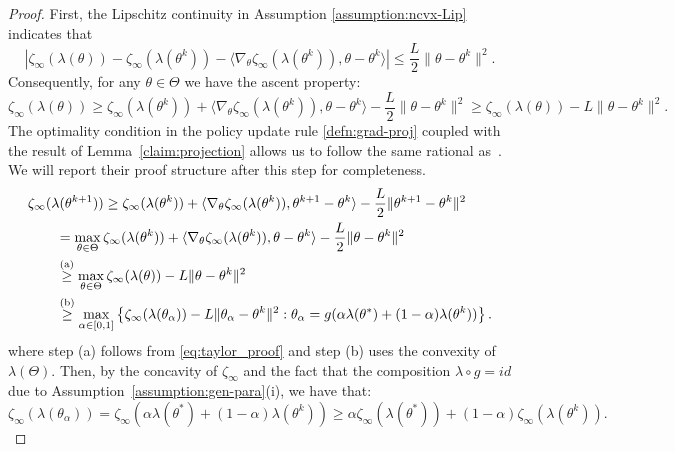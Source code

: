 \begin{proof}
    First, the Lipschitz continuity in Assumption \ref{assumption:ncvx-Lip} indicates that 
        $$\left|\zeta_\infty(\lambda(\theta)) - \zeta_\infty(\lambda(\theta^k)) - \langle \nabla_\theta\zeta_\infty(\lambda(\theta^k)),\theta-\theta^k\rangle\right|\leq \frac{L}{2}\|\theta-\theta^k\|^2.$$
        Consequently, for any $\theta\in\Theta$ we have the ascent property:
        \begin{equation}\label{eq:taylor_proof}
        \zeta_\infty(\lambda(\theta)) \geq \zeta_\infty(\lambda(\theta^k)) + \langle \nabla_\theta\zeta_\infty(\lambda(\theta^k)),\theta-\theta^k\rangle - \frac{L}{2}\|\theta-\theta^k\|^2 \geq \zeta_\infty(\lambda(\theta)) - L\|\theta-\theta^k\|^2.
        \end{equation}
        The optimality condition in the policy update rule \eqref{defn:grad-proj} coupled with the result of Lemma~\ref{claim:projection} allows us to follow the same rational as~\citet{zhang2020variationalpolicygradientmethod}. We will report their proof structure after this step for completeness.
    \begin{align}
        \label{thm:ItrCmp-1}
        \MoveEqLeft
        \zeta_\infty(\lambda(\theta^{k+1}))  \geq  \zeta_\infty(\lambda(\theta^k)) + \langle \nabla_\theta\zeta_\infty(\lambda(\theta^k)),\theta^{k+1}-\theta^k\rangle - \frac{L}{2}\|\theta^{k+1}-\theta^k\|^2 \nonumber \\
        & =  \max_{\theta\in\Theta} \zeta_\infty(\lambda(\theta^k)) + \langle \nabla_\theta\zeta_\infty(\lambda(\theta^k)),\theta-\theta^k\rangle - \frac{L}{2}\|\theta-\theta^k\|^2\nonumber\\
        & \overset{\text{(a)}}{\geq}  \max_{\theta\in\Theta} \zeta_\infty(\lambda(\theta)) - L\|\theta-\theta^k\|^2\nonumber\\
        & \overset{\text{(b)}}{\geq}   \max_{\alpha\in[0,1]}\left\{\zeta_\infty(\lambda(\theta_{\alpha})) - L\|\theta_{\alpha}-\theta^k\|^2: \theta_{\alpha} = g(\alpha\lambda(\theta^*) + (1-\alpha)\lambda(\theta^k)) \right\}.
    \end{align}
        where step (a) follows from \eqref{eq:taylor_proof} and step (b) uses the convexity of $\lambda(\Theta)$. Then, by the concavity of $\zeta_\infty$ and the fact that the composition $\lambda\circ g = id$ due to Assumption~\ref{assumption:gen-para}(i), we have that:
        $$\zeta_\infty(\lambda(\theta_{\alpha})) = \zeta_\infty(\alpha\lambda(\theta^*) + (1-\alpha)\lambda(\theta^k))\geq\alpha\zeta_\infty(\lambda(\theta^*)) + (1-\alpha)\zeta_\infty(\lambda(\theta^k)).$$

\end{proof}

